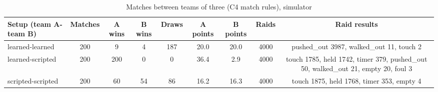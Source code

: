 \begin{table}[t]
\centering
\caption{Matches between teams of three (C4 match rules), simulator}
\label{tab:T4_matches}
\begin{tabular}{lcccccccc}
\toprule
Setup (team A-team B) & Matches & A wins & B wins & Draws & A points & B points & Raids & Raid results \\
\midrule
learned-learned & 200 & 9 & 4 & 187 & 20.0 & 20.0 & 4000 & pushed\_out 3987, walked\_out 11, touch 2 \\
learned-scripted & 200 & 200 & 0 & 0 & 36.4 & 2.9 & 4000 & touch 1785, held 1742, timer 379, pushed\_out 50, walked\_out 21, empty 20, foul 3 \\
scripted-scripted & 200 & 60 & 54 & 86 & 16.2 & 16.3 & 4000 & touch 1875, held 1768, timer 353, empty 4 \\
\bottomrule
\end{tabular}
\end{table}
